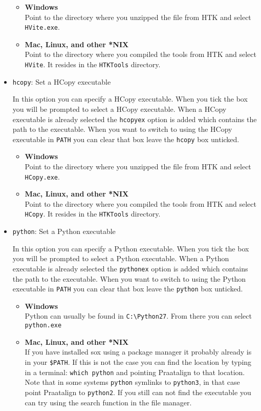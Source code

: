 \begin{itemize}
		\begin{itemize}
			\item \textbf{Windows}\\
				Point to the directory where you unzipped the file
				from HTK and select \texttt{HVite.exe}.
			\item \textbf{Mac, Linux, and other *NIX}\\
				Point to the directory where you compiled the tools from HTK and
				select \texttt{HVite}. It resides in the \texttt{HTKTools}
				directory.
		\end{itemize}
	\item \texttt{hcopy}: %
		Set a HCopy executable

		In this option you can specify a HCopy executable. When you tick the box you
		will be prompted to select a HCopy executable. When a HCopy executable is
		already selected the \texttt{hcopyex} option is added which contains the
		path to the executable. When you want to switch to using the HCopy
		executable in \texttt{PATH} you can clear that box leave the \texttt{hcopy}
		box unticked.

		\begin{itemize}
			\item \textbf{Windows}\\
				Point to the directory where you unzipped the file
				from HTK and select \texttt{HCopy.exe}.
			\item \textbf{Mac, Linux, and other *NIX}\\
				Point to the directory where you compiled the tools from HTK and
				select \texttt{HCopy}. It resides in the \texttt{HTKTools}
				directory.
		\end{itemize}
	\item \texttt{python}: %
		Set a Python executable

		In this option you can specify a Python executable. When you tick the box
		you will be prompted to select a Python executable. When a Python
		executable is already selected the \texttt{pythonex} option is added which
		contains the path to the executable. When you want to switch to using the
		Python executable in \texttt{PATH} you can clear that box leave the
		\texttt{python} box unticked.

		\begin{itemize}
			\item \textbf{Windows}\\
				Python can usually be found in \texttt{C:\textbackslash Python27}.
				From there you can select \texttt{python.exe}
			\item \textbf{Mac, Linux, and other *NIX}\\
				If you have installed sox using a package manager it probably
				already is in your \texttt{\$PATH}. If this is not the case you can
				find the location by typing in a terminal: \texttt{which python}
				and pointing Praatalign to that location. Note that in some systems
				\texttt{python} symlinks to \texttt{python3}, in that case point
				Praatalign to \texttt{python2}. If you still can not find the
				executable you can try using the search function in the file
				manager.
		\end{itemize}
\end{itemize}
